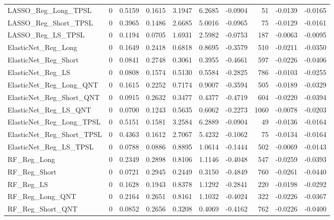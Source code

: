 \begin{tabular}{llrrrrrrrr}
\cline{1-10}
LASSO\_Reg\_Long\_TPSL & 0 & 0.5159 & 0.1615 & 3.1947 & 6.2685 & -0.0904 & 51 & -0.0139 & -0.0165 \\
\cline{1-10}
LASSO\_Reg\_Short\_TPSL & 0 & 0.3965 & 0.1486 & 2.6685 & 5.0016 & -0.0965 & 75 & -0.0129 & -0.0161 \\
\cline{1-10}
LASSO\_Reg\_LS\_TPSL & 0 & 0.1194 & 0.0705 & 1.6931 & 2.5982 & -0.0753 & 187 & -0.0063 & -0.0095 \\
\cline{1-10}
ElasticNet\_Reg\_Long & 0 & 0.1649 & 0.2418 & 0.6818 & 0.8695 & -0.3579 & 510 & -0.0211 & -0.0350 \\
\cline{1-10}
ElasticNet\_Reg\_Short & 0 & 0.0841 & 0.2748 & 0.3061 & 0.3955 & -0.4661 & 597 & -0.0226 & -0.0406 \\
\cline{1-10}
ElasticNet\_Reg\_LS & 0 & 0.0808 & 0.1574 & 0.5130 & 0.5584 & -0.2825 & 786 & -0.0103 & -0.0255 \\
\cline{1-10}
ElasticNet\_Reg\_Long\_QNT & 0 & 0.1615 & 0.2252 & 0.7174 & 0.9007 & -0.3594 & 505 & -0.0189 & -0.0329 \\
\cline{1-10}
ElasticNet\_Reg\_Short\_QNT & 0 & 0.0915 & 0.2632 & 0.3477 & 0.4377 & -0.4719 & 604 & -0.0220 & -0.0394 \\
\cline{1-10}
ElasticNet\_Reg\_LS\_QNT & 0 & 0.0700 & 0.1243 & 0.5635 & 0.6062 & -0.2273 & 1060 & -0.0078 & -0.0203 \\
\cline{1-10}
ElasticNet\_Reg\_Long\_TPSL & 0 & 0.5151 & 0.1581 & 3.2584 & 6.2889 & -0.0904 & 49 & -0.0136 & -0.0164 \\
\cline{1-10}
ElasticNet\_Reg\_Short\_TPSL & 0 & 0.4363 & 0.1612 & 2.7067 & 5.4232 & -0.1062 & 75 & -0.0134 & -0.0164 \\
\cline{1-10}
ElasticNet\_Reg\_LS\_TPSL & 0 & 0.0788 & 0.0886 & 0.8895 & 1.0614 & -0.1444 & 502 & -0.0069 & -0.0143 \\
\cline{1-10}
RF\_Reg\_Long & 0 & 0.2349 & 0.2898 & 0.8106 & 1.1146 & -0.4048 & 547 & -0.0259 & -0.0393 \\
\cline{1-10}
RF\_Reg\_Short & 0 & 0.0721 & 0.2945 & 0.2449 & 0.3150 & -0.4849 & 760 & -0.0261 & -0.0440 \\
\cline{1-10}
RF\_Reg\_LS & 0 & 0.1628 & 0.1943 & 0.8378 & 1.1292 & -0.2841 & 220 & -0.0198 & -0.0292 \\
\cline{1-10}
RF\_Reg\_Long\_QNT & 0 & 0.2164 & 0.2651 & 0.8161 & 1.1032 & -0.4024 & 322 & -0.0226 & -0.0367 \\
\cline{1-10}
RF\_Reg\_Short\_QNT & 0 & 0.0852 & 0.2656 & 0.3208 & 0.4069 & -0.4162 & 762 & -0.0226 & -0.0400 \\

\end{tabular}
